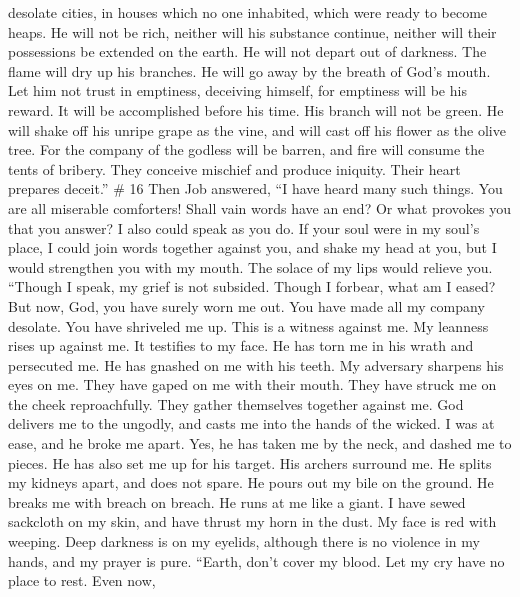 desolate cities, in houses which no one inhabited, which were ready to
become heaps.  He will not be rich, neither will his
substance continue, neither will their possessions be extended on the
earth.  He will not depart out of darkness. The flame will
dry up his branches. He will go away by the breath of God's mouth.
 Let him not trust in emptiness, deceiving himself, for
emptiness will be his reward.  It will be accomplished
before his time. His branch will not be green.  He will
shake off his unripe grape as the vine, and will cast off his flower as
the olive tree.  For the company of the godless will be
barren, and fire will consume the tents of bribery.  They
conceive mischief and produce iniquity. Their heart prepares deceit.''
\# 16  Then Job answered,  ``I have heard many
such things. You are all miserable comforters!  Shall vain
words have an end? Or what provokes you that you answer?  I
also could speak as you do. If your soul were in my soul's place, I
could join words together against you, and shake my head at you,
 but I would strengthen you with my mouth. The solace of my
lips would relieve you.  ``Though I speak, my grief is not
subsided. Though I forbear, what am I eased?  But now, God,
you have surely worn me out. You have made all my company desolate.
 You have shriveled me up. This is a witness against me. My
leanness rises up against me. It testifies to my face.  He
has torn me in his wrath and persecuted me. He has gnashed on me with
his teeth. My adversary sharpens his eyes on me.  They have
gaped on me with their mouth. They have struck me on the cheek
reproachfully. They gather themselves together against me. 
God delivers me to the ungodly, and casts me into the hands of the
wicked.  I was at ease, and he broke me apart. Yes, he has
taken me by the neck, and dashed me to pieces. He has also set me up for
his target.  His archers surround me. He splits my kidneys
apart, and does not spare. He pours out my bile on the ground.
 He breaks me with breach on breach. He runs at me like a
giant.  I have sewed sackcloth on my skin, and have thrust
my horn in the dust.  My face is red with weeping. Deep
darkness is on my eyelids,  although there is no violence
in my hands, and my prayer is pure.  ``Earth, don't cover
my blood. Let my cry have no place to rest.  Even now,
